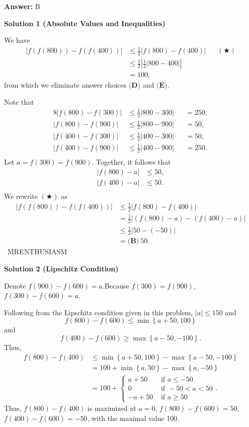 \begin{enumerate}
 \textbf{Answer: }B



\textbf{Solution 1 (Absolute Values and Inequalities)}

We have
 \begin{align*} |f(f(800))-f(f(400))| &\leq \frac12|f(800)-f(400)| &&(\bigstar) \\ &\leq \frac12\left|\frac12|800-400|\right| \\ &= 100, \end{align*}
from which we eliminate answer choices $\textbf{(D)}$ and $\textbf{(E)}.$

 Note that
 \begin{alignat*}{8} |f(800)-f(300)| &\leq \frac12|800-300| &&= 250, \\ |f(800)-f(900)| &\leq \frac12|800-900| &&= 50, \\ |f(400)-f(300)| &\leq \frac12|400-300| &&= 50, \\ |f(400)-f(900)| &\leq \frac12|400-900| &&= 250. \\ \end{alignat*}Let $a=f(300)=f(900).$ Together, it follows that 
 \begin{align*} |f(800)-a|&\leq 50, \\ |f(400)-a|&\leq 50. \\ \end{align*}
We rewrite $(\bigstar)$ as
 \begin{align*} |f(f(800))-f(f(400))| &\leq \frac12|f(800)-f(400)| \\ &= \frac12|(f(800)-a)-(f(400)-a)| \\ &\leq \frac12|50-(-50)| \\ &=\boxed{\textbf{(B)}\ 50}. \end{align*}
~MRENTHUSIASM

 



\textbf{Solution 2 (Lipschitz Condition)}

Denote $f(900)-f(600) = a$.Because $f(300) = f(900)$, $f(300) - f(600) = a$.

 Following from the Lipschitz condition given in this problem, $|a| \leq 150$ and
 \[ f(800) - f(600) \leq \min \left\{ a + 50 , 100 \right\} \]and
 \[ f(400) - f(600) \geq \max \left\{ a - 50 , -100 \right\} . \]Thus,
 \begin{align*} f(800) - f(400) & \leq \min \left\{ a + 50 , 100 \right\} - \max \left\{ a - 50 , -100 \right\}  \\ & = 100 + \min \left\{ a, 50 \right\} - \max \left\{ a , - 50 \right\} \\ & = 100 + \left\{ \begin{array}{ll} a + 50 & \mbox{ if } a \leq -50 \\ 0 & \mbox{ if } -50 < a < 50 \\ -a + 50 & \mbox{ if } a \geq 50 \end{array} \right. . \end{align*}
Thus, $f(800) - f(400)$ is maximized at $a = 0$, $f(800)-f(600) = 50$, $f(400)-f(600)=-50$, with the maximal value 100.


\end{enumerate}
